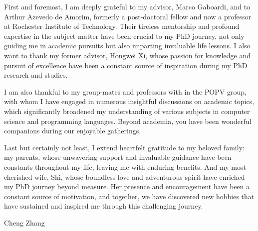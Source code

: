 First and foremost, I am deeply grateful to my advisor, Marco Gaboardi, and to Arthur Azevedo de Amorim, formerly a post-doctoral fellow and now a professor at Rochester Institute of Technology. Their tireless mentorship and profound expertise in the subject matter have been crucial to my PhD journey, not only guiding me in academic pursuits but also imparting invaluable life lessons. I also want to thank my former advisor, Hongwei Xi, whose passion for knowledge and pursuit of excellence have been a constant source of inspiration during my PhD research and studies.

I am also thankful to my group-mates and professors with in the POPV group, with whom I have engaged in numerous insightful discussions on academic topics, which significantly broadened my understanding of various subjects in computer science and programming languages. Beyond academia, you have been wonderful companions during our enjoyable gatherings.

Last but certainly not least, I extend heartfelt gratitude to my beloved family: my parents, whose unwavering support and invaluable guidance have been constants throughout my life, leaving me with enduring benefits. And my most cherished wife, Shi, whose boundless love and adventurous spirit have enriched my PhD journey beyond measure. Her presence and encouragement have been a constant source of motivation, and together, we have discovered new hobbies that have sustained and inspired me through this challenging journey.

\vskip 1in

\noindent
Cheng Zhang\\
